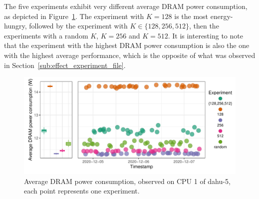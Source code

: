             The five experiments exhibit very different average DRAM power consumption, as depicted in
            Figure~\ref{fig:randomizing_sizes:expfile:fixing_K:power_DRAM}. The experiment with \(K=128\) is the most
            energy-hungry, followed by the experiment with \(K\in\{128,256,512\}\), then the experiments with a random
            \(K\), \(K=256\) and \(K=512\). It is interesting to note that the experiment with the highest DRAM power
            consumption is also the one with the highest average \dgemm performance, which is the opposite of what was
            observed in Section~\ref{sub:effect_experiment_file}.
            \begin{figure}[htpb]
                \centering
                \includegraphics[width=1\linewidth]{img/experiment/randomizing_sizes/fixing_K/average_power_DRAM.pdf}
                \caption{Average DRAM power consumption, observed on CPU 1 of dahu-5, each point represents one experiment.}%
                \label{fig:randomizing_sizes:expfile:fixing_K:power_DRAM}
            \end{figure}

